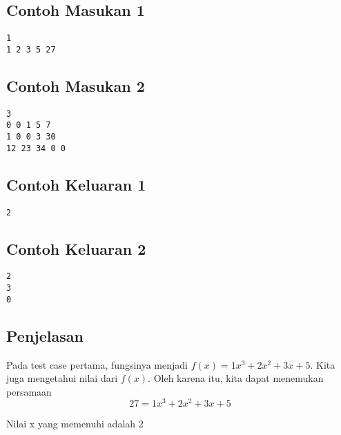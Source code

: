\documentclass{article}
\begin{document}
\begin{multicols}{2}
\subsection*{Contoh Masukan 1}
\begin{lstlisting}
1
1 2 3 5 27
\end{lstlisting}

\subsection*{Contoh Masukan 2}
\begin{lstlisting}
3
0 0 1 5 7
1 0 0 3 30
12 23 34 0 0
\end{lstlisting}

\columnbreak
\subsection*{Contoh Keluaran 1}
\begin{lstlisting}
2
\end{lstlisting}

\subsection*{Contoh Keluaran 2}
\begin{lstlisting}
2
3
0
\end{lstlisting}
\end{multicols}


\subsection*{Penjelasan}
Pada test case pertama, fungsinya menjadi \(f(x) = 1x^3 + 2x^2 + 3x + 5\). Kita juga mengetahui nilai dari \(f(x)\). Oleh karena itu, kita dapat menemukan persamaan
\[27 = 1x^3 + 2x^2 + 3x + 5\]

Nilai x yang memenuhi adalah 2


\pagebreak
\end{document}
